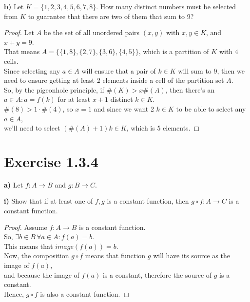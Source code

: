 \documentclass[titlepage, letterpaper, fleqn]{article}
\newcommand{\spacepls}{\vspace{5mm}}
\begin{document}
\spacepls

{\large \textbf{b)} Let \(K = \{1, 2, 3, 4, 5, 6, 7, 8\}\). How many distinct numbers must be selected from \(K\) to guarantee that there are two of them that sum to 9?}

\begin{proof}
Let \(A\) be the set of all unordered pairs \((x,y)\) with \(x,y \in K\), and \(x+y = 9\).\\
That means \(A = \{\{1,8\}, \{2,7\}, \{3,6\}, \{4,5\}\}\), which is a partition of \(K\) with \(4\) cells.\\
Since selecting any \(a \in A\) will ensure that a pair of \(k \in K\) will sum to 9, then we need to ensure getting at least 2 elements inside a cell of the partition set \(A\).\\
So, by the pigeonhole principle, if \(\#(K) > x\#(A)\), then there's an \(a \in A \colon a = f(k)\) for at least \(x+1\) distinct \(k \in K\).\\
\(\#(8) > 1\cdot \#(4)\), so \(x = 1\) and since we want 2 \(k \in K\) to be able to select any \(a \in A\),\\
we'll need to select \((\#(A) + 1) k \in K\), which is 5 elements.
\end{proof}

\section{Exercise 1.3.4}

{\large \textbf{a)} Let \(f \colon A \to B\) and \(g \colon B \to C\)}.

\textbf{i)} Show that if at least one of \(f,g\) is a constant function, then \(g \circ f \colon A \to C\) is a constant function.

\begin{proof}
Assume \(f \colon A \to B\) is a constant function.\\
So, \(\exists b \in B \, \forall a \in A \colon f(a) = b\).\\
This means that \(image(f(a)) = b\).\\
Now, the composition \(g \circ f\) means that function \(g\) will have its source as the image of \(f(a)\),\\
and because the image of \(f(a)\) is a constant, therefore the source of \(g\) is a constant.\\
Hence, \(g \circ f\) is also a constant function.
\end{proof}

\spacepls
\end{document}
